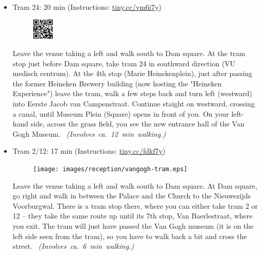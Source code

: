 \begin{itemize}
\pagebreak
\item Tram 24: \hfill 20 min (Instructions: \url{tiny.cc/vm6i7y})

\begin{minipage}{.9\textwidth}
\begin{figure}
\vspace*{-1.2\baselineskip}%
\includegraphics[width=1cm]{images/reception/vangogh-tram-24.png}
\end{figure}
Leave the venue taking a left and walk south to Dam square. At the tram stop just before Dam square, take tram 24 in southward direction (VU medisch centrum). At the 4th stop (Marie Heinekenplein), just after passing the former Heineken Brewery building (now hosting the "Heineken Experience") leave the tram, walk a few steps back and turn left (westward) into Eerste Jacob van Campenstraat. Continue staight on westward, crossing a canal, until Museum Plein (Square) opens in front of you. On your left-hand side, across the grass field, you see the new entrance hall of the Van Gogh Museum.
~\hspace*{\fill}\mbox{\emph{(Involves ca.\ 12 min walking.)}}
\end{minipage}

\item Tram 2/12: \hfill 17 min (Instructions: \url{tiny.cc/fdkf7y})

\begin{minipage}{.9\textwidth}
\begin{figure}
\vspace*{-1.2\baselineskip}%
\texttt{[image: images/reception/vangogh-tram.eps]}
\end{figure}
Leave the venue taking a left and walk south to Dam square. At Dam square, go right and walk in between the Palace and the Church to the Nieuwezijds Voorburgwal. There is a tram stop there, where you can either take tram 2 or 12  -- they take the same route up until its 7th stop, Van Baerlestraat, where you exit. The tram will just have passed the Van Gogh museum (it is on the left side seen from the tram), so you have to walk back a bit and cross the street.
~\hspace*{\fill}\mbox{\emph{(Involves ca.\ 6 min walking.)}}
\end{minipage}

\end{itemize}

